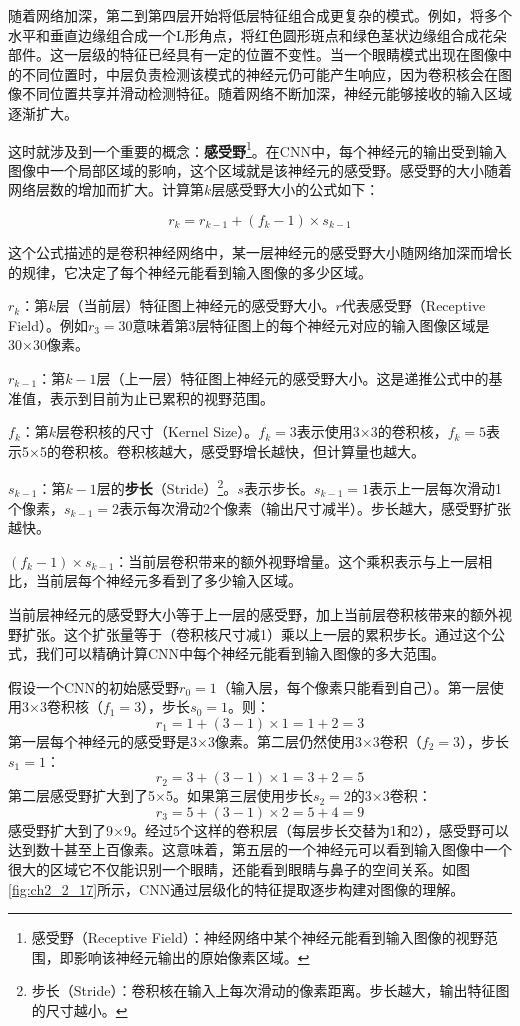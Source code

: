 随着网络加深，第二到第四层开始将低层特征组合成更复杂的模式。例如，将多个水平和垂直边缘组合成一个L形角点，将红色圆形斑点和绿色茎状边缘组合成花朵部件。这一层级的特征已经具有一定的位置不变性。当一个眼睛模式出现在图像中的不同位置时，中层负责检测该模式的神经元仍可能产生响应，因为卷积核会在图像不同位置共享并滑动检测特征。随着网络不断加深，神经元能够接收的输入区域逐渐扩大。

这时就涉及到一个重要的概念：\textbf{感受野}\footnote{感受野（Receptive Field）：神经网络中某个神经元能看到输入图像的视野范围，即影响该神经元输出的原始像素区域。}。在CNN中，每个神经元的输出受到输入图像中一个局部区域的影响，这个区域就是该神经元的感受野。感受野的大小随着网络层数的增加而扩大。计算第$k$层感受野大小的公式如下：

\[
r_k = r_{k-1} + (f_k - 1) \times s_{k-1}
\]

这个公式描述的是卷积神经网络中，某一层神经元的感受野大小随网络加深而增长的规律，它决定了每个神经元能看到输入图像的多少区域。



$r_k$：第$k$层（当前层）特征图上神经元的感受野大小。$r$代表感受野（Receptive Field）。例如$r_3=30$意味着第3层特征图上的每个神经元对应的输入图像区域是30×30像素。

$r_{k-1}$：第$k-1$层（上一层）特征图上神经元的感受野大小。这是递推公式中的基准值，表示到目前为止已累积的视野范围。

$f_k$：第$k$层卷积核的尺寸（Kernel Size）。$f_k=3$表示使用3×3的卷积核，$f_k=5$表示5×5的卷积核。卷积核越大，感受野增长越快，但计算量也越大。

$s_{k-1}$：第$k-1$层的\textbf{步长}（Stride）\footnote{步长（Stride）：卷积核在输入上每次滑动的像素距离。步长越大，输出特征图的尺寸越小。}。$s$表示步长。$s_{k-1}=1$表示上一层每次滑动1个像素，$s_{k-1}=2$表示每次滑动2个像素（输出尺寸减半）。步长越大，感受野扩张越快。

$(f_k - 1) \times s_{k-1}$：当前层卷积带来的额外视野增量。这个乘积表示与上一层相比，当前层每个神经元多看到了多少输入区域。

当前层神经元的感受野大小等于上一层的感受野，加上当前层卷积核带来的额外视野扩张。这个扩张量等于（卷积核尺寸减1）乘以上一层的累积步长。通过这个公式，我们可以精确计算CNN中每个神经元能看到输入图像的多大范围。

假设一个CNN的初始感受野$r_0=1$（输入层，每个像素只能看到自己）。第一层使用3×3卷积核（$f_1=3$），步长$s_0=1$。则：
\[
r_1 = 1 + (3 - 1) \times 1 = 1 + 2 = 3
\]
第一层每个神经元的感受野是3×3像素。第二层仍然使用3×3卷积（$f_2=3$），步长$s_1=1$：
\[
r_2 = 3 + (3 - 1) \times 1 = 3 + 2 = 5
\]
第二层感受野扩大到了5×5。如果第三层使用步长$s_2=2$的3×3卷积：
\[
r_3 = 5 + (3 - 1) \times 2 = 5 + 4 = 9
\]
感受野扩大到了9×9。经过5个这样的卷积层（每层步长交替为1和2），感受野可以达到数十甚至上百像素。这意味着，第五层的一个神经元可以看到输入图像中一个很大的区域它不仅能识别一个眼睛，还能看到眼睛与鼻子的空间关系。如图\ref{fig:ch2_2_17}所示，CNN通过层级化的特征提取逐步构建对图像的理解。


